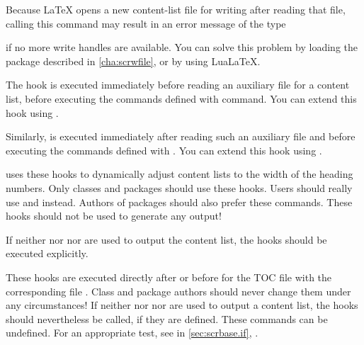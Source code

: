 Because \LaTeX{} opens a new content-list file for
writing after reading that file, calling this command may result in an error
message of the type
if no more write handles are available. You can solve this problem by loading
the 
package described in \autoref{cha:scrwfile}, or by using Lua\LaTeX{}.%
\EndIndexGroup


\begin{Declaration}
\end{Declaration}
The  hook is executed immediately before reading
an auxiliary file for a content list, before executing the commands defined
with  command. You can extend this
hook using .

Similarly,  is executed immediately after reading
such an auxiliary file and before executing the commands defined with
. You can extend this hook using
.

\KOMAScript{} uses these hooks to dynamically adjust content lists to the
width of the heading numbers. Only classes and packages should use these
hooks. Users should really use
 and
 instead. Authors of packages should
also prefer these commands. These hooks should not be used to generate any
output!

If neither  nor
 nor  are
used to output the content list, the hooks should be executed explicitly.%
\EndIndexGroup


\begin{Declaration}
\end{Declaration}
These hooks are executed directly after
 or before
 for the TOC file with the
corresponding file . Class and package
authors should never change them under any circumstances! If
neither  nor
 nor  are
used to output a content list, the hooks should nevertheless be called, if
they are defined. These commands can be undefined. For an appropriate test,
see %
 in \autoref{sec:scrbase.if},
.%
\EndIndexGroup


